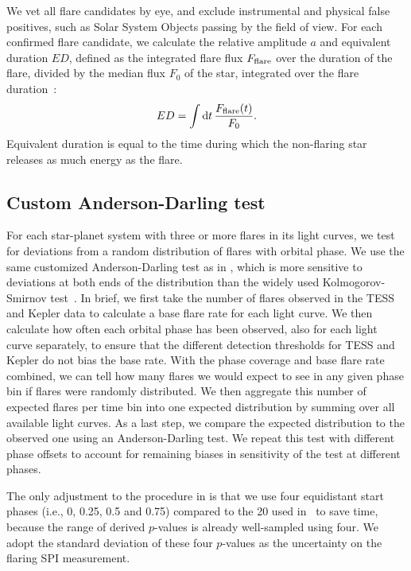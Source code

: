 \documentclass[twocolumn]{aastex631}
\begin{document}
We vet all flare candidates by eye, and exclude instrumental and physical false positives, such as Solar System Objects passing by the field of view. For each confirmed flare candidate, we calculate the relative amplitude $a$ and equivalent duration $ED$, defined as the integrated flare flux $F_{\rm flare}$ over the duration of the flare, divided by the median flux $F_0$ of the star, integrated over the flare duration~\citep{gershberg1972results}:
\begin{equation}
\label{eq:ED}
ED=\displaystyle \int \mathrm dt\, \frac{F_{\rm flare}(t)}{F_0}.
\end{equation}
Equivalent duration is equal to the time during which the non-flaring star releases as much energy as the flare.


\subsection{Custom Anderson-Darling test}
\label{sec:methods:adtest}
For each star-planet system with three or more flares in its light curves, we test for deviations from a random distribution of flares with orbital phase. We use the same customized Anderson-Darling test as in \cite{ilin2022searching}, which is more sensitive to deviations at both ends of the distribution than the widely used Kolmogorov-Smirnov test~\citep{feigelson2012modern}. In brief, we first take the number of flares observed in the TESS and Kepler data to calculate a base flare rate for each light curve. We then calculate how often each orbital phase has been observed, also for each light curve separately, to ensure that the different detection thresholds for TESS and Kepler do not bias the base rate. With the phase coverage and base flare rate combined, we can tell how many flares we would expect to see in any given phase bin if flares were randomly distributed. We then aggregate this number of expected flares per time bin into one expected distribution by summing over all available light curves. As a last step, we compare the expected distribution to the observed one using an Anderson-Darling test. We repeat this test with different phase offsets to account for remaining biases in sensitivity of the test at different phases.

The only adjustment to the procedure in \cite{ilin2022searching} is that we use four equidistant start phases (i.e., 0, 0.25, 0.5 and 0.75) compared to the 20 used in~\cite{ilin2022searching} to save time, because the range of derived $p$-values is already well-sampled using four. We adopt the standard deviation of these four $p$-values as the uncertainty on the flaring SPI measurement.
\end{document}
